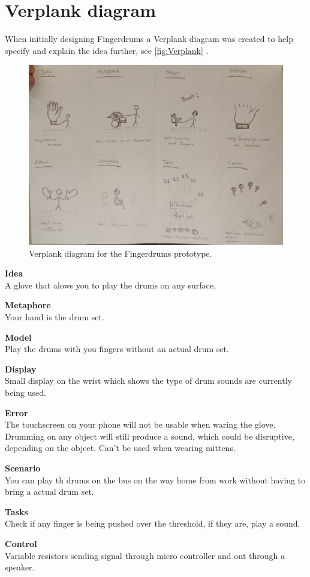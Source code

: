 \section{Verplank diagram}
\label{Verplank_diagram}
When initially designing Fingerdrums a Verplank diagram was created to help specify and explain the idea further, see \autoref{fig:Verplank} . 
\blankline

\begin{figure}[H]
\centering
\includegraphics[scale = 0.1]{Figure/Billeder/IMG_20171114_121155.jpg}
\caption{Verplank diagram for the Fingerdrums prototype.}
\label{fig:Verplank}
\end{figure}

\textbf{Idea}\\
A glove that alows you to play the drums on any surface.
\blankline

\textbf{Metaphore}\\
Your hand is the drum set.  
\blankline

\textbf{Model}\\
Play the drums with you fingers without an actual drum set.
\blankline

\textbf{Display}\\
Small display on the wrist which shows the type of drum sounds are currently being used.
\blankline

\textbf{Error}\\
The touchscreen on your phone will not be usable when waring the glove. Drumming on any object will still produce a sound, which could be disruptive, depending on the object. Can't be used when wearing mittens.
\blankline

\textbf{Scenario}\\
You can play th drums on the bus on the way home from work without having to bring a actual drum set.
\blankline

\textbf{Tasks}\\
Check if any finger is being pushed over the threshold, if they are, play a sound.
\blankline

\textbf{Control}\\
Variable resistors sending signal through micro controller and out through a speaker.